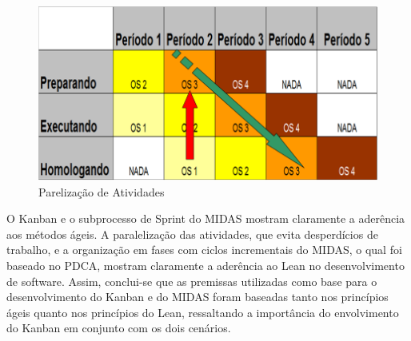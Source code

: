 \begin{figure}[H]
		\centering
		\label{fig09}
			\includegraphics[scale=0.5]{figuras/kanbanIPHAN5.png}
		\caption{Parelização de Atividades \cite{parente}}
\end{figure}

O Kanban e o subprocesso de Sprint do MIDAS mostram claramente a aderência aos métodos ágeis. A paralelização das atividades, que evita desperdícios de trabalho, e a organização em fases com ciclos incrementais do MIDAS, o qual foi baseado no PDCA, mostram claramente a aderência ao Lean no desenvolvimento de software. Assim, conclui-se que as premissas utilizadas como base para o desenvolvimento do Kanban e do MIDAS foram baseadas tanto nos princípios ágeis quanto nos princípios do Lean, ressaltando a importância do envolvimento do Kanban em conjunto com os dois cenários.